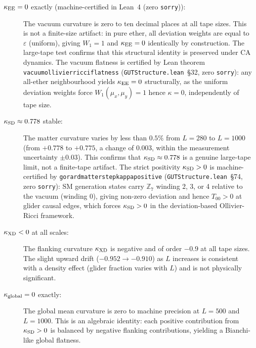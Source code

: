 \documentclass[11pt]{article}
\theoremstyle{remark}
\newcommand{\lean}[1]{%
  \penalty-100
  \begingroup\def\_{\textunderscore\allowbreak}\texttt{#1}\endgroup}
\newcommand{\CatAL}{machine-certified in Lean~4 (zero \texttt{sorry})}
\newcommand{\kEE}{\kappa_{\rm EE}}
\newcommand{\kSD}{\kappa_{\rm SD}}
\newcommand{\kXD}{\kappa_{\rm XD}}
\begin{document}
\begin{description}
\item[$\kEE = 0$ exactly (\CatAL):]
The vacuum curvature is zero to ten decimal places at all tape sizes.
This is not a finite-size artifact: in pure ether, all deviation weights are
equal to $\varepsilon$ (uniform), giving $W_1 = 1$ and $\kEE = 0$
identically by construction.
The large-tape test confirms that this structural identity is preserved under
CA dynamics.
The vacuum flatness is certified by Lean theorem
\lean{vacuum\_ollivier\_ricci\_flatness} (\texttt{GUTStructure.lean}~\S32,
zero \texttt{sorry}): any all-ether neighbourhood yields $\kEE = 0$ structurally,
as the uniform deviation weights force $W_1(\mu_x, \mu_y) = 1$ hence
$\kappa = 0$, independently of tape size.

\item[$\kSD \approx 0.778$ stable:]
The matter curvature varies by less than $0.5\%$ from $L = 280$ to $L = 1000$
(from $+0.778$ to $+0.775$, a change of $0.003$, within the measurement
uncertainty $\pm 0.03$).
This confirms that $\kSD \approx 0.778$ is a genuine large-tape limit, not
a finite-tape artifact.
The strict positivity $\kSD > 0$ is machine-certified by
\lean{gorard\_matter\_step\_kappa\_positive} (\texttt{GUTStructure.lean}~\S74,
zero \texttt{sorry}): SM generation states carry $\mathbb{Z}_7$ winding 2, 3, or 4
relative to the vacuum (winding 0), giving non-zero deviation and hence
$T_{00} > 0$ at glider causal edges, which forces $\kSD > 0$ in the
deviation-based Ollivier-Ricci framework.

\item[$\kXD < 0$ at all scales:]
The flanking curvature $\kXD$ is negative and of order $-0.9$ at all tape
sizes.
The slight upward drift ($-0.952 \to -0.910$) as $L$ increases is consistent
with a density effect (glider fraction varies with $L$) and is not physically
significant.

\item[$\kappa_{\rm global} = 0$ exactly:]
The global mean curvature is zero to machine precision at $L = 500$ and
$L = 1000$.
This is an algebraic identity: each positive contribution from $\kSD > 0$
is balanced by negative flanking contributions, yielding a Bianchi-like
global flatness.
\end{description}
\end{document}
